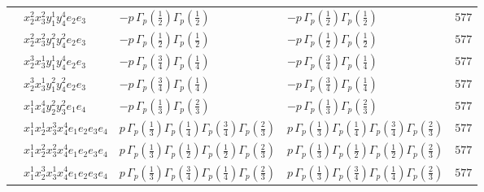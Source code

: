 \documentclass[11pt]{article}
\begin{document}
\begin{table}[ht]
{\begin{tabular}{@{}lllll@{}}
 & $x_{2}^{2} x_{3}^{2} y_{1}^{1} y_{4}^{4} e_{2} e_{3}$ & $- p \, \Gamma_p \left( \frac{1}{2} \right) \Gamma_p \left( \frac{1}{2} \right)$ & $- p \, \Gamma_p \left( \frac{1}{2} \right) \Gamma_p \left( \frac{1}{2} \right)$ & $577$ \\
 & $x_{2}^{2} x_{3}^{2} y_{1}^{2} y_{4}^{2} e_{2} e_{3}$ & $- p \, \Gamma_p \left( \frac{1}{2} \right) \Gamma_p \left( \frac{1}{2} \right)$ & $- p \, \Gamma_p \left( \frac{1}{2} \right) \Gamma_p \left( \frac{1}{2} \right)$ & $577$ \\
 & $x_{2}^{3} x_{3}^{1} y_{1}^{1} y_{4}^{4} e_{2} e_{3}$ & $- p \, \Gamma_p \left( \frac{3}{4} \right) \Gamma_p \left( \frac{1}{4} \right)$ & $- p \, \Gamma_p \left( \frac{3}{4} \right) \Gamma_p \left( \frac{1}{4} \right)$ & $577$ \\
 & $x_{2}^{3} x_{3}^{1} y_{1}^{2} y_{4}^{2} e_{2} e_{3}$ & $- p \, \Gamma_p \left( \frac{3}{4} \right) \Gamma_p \left( \frac{1}{4} \right)$ & $- p \, \Gamma_p \left( \frac{3}{4} \right) \Gamma_p \left( \frac{1}{4} \right)$ & $577$ \\
 & $x_{1}^{1} x_{4}^{4} y_{2}^{2} y_{3}^{2} e_{1} e_{4}$ & $- p \, \Gamma_p \left( \frac{1}{3} \right) \Gamma_p \left( \frac{2}{3} \right)$ & $- p \, \Gamma_p \left( \frac{1}{3} \right) \Gamma_p \left( \frac{2}{3} \right)$ & $577$ \\
 & $x_{1}^{1} x_{2}^{1} x_{3}^{3} x_{4}^{4}  e_{1} e_{2} e_{3} e_{4}$ & $p \, \Gamma_p \left( \frac{1}{3} \right) \Gamma_p \left( \frac{1}{4} \right) \Gamma_p \left( \frac{3}{4} \right) \Gamma_p \left( \frac{2}{3} \right)$ & $p \, \Gamma_p \left( \frac{1}{3} \right) \Gamma_p \left( \frac{1}{4} \right) \Gamma_p \left( \frac{3}{4} \right) \Gamma_p \left( \frac{2}{3} \right)$ & $577$ \\
 & $x_{1}^{1} x_{2}^{2} x_{3}^{2} x_{4}^{4}  e_{1} e_{2} e_{3} e_{4}$ & $p \, \Gamma_p \left( \frac{1}{3} \right) \Gamma_p \left( \frac{1}{2} \right) \Gamma_p \left( \frac{1}{2} \right) \Gamma_p \left( \frac{2}{3} \right)$ & $p \, \Gamma_p \left( \frac{1}{3} \right) \Gamma_p \left( \frac{1}{2} \right) \Gamma_p \left( \frac{1}{2} \right) \Gamma_p \left( \frac{2}{3} \right)$ & $577$ \\
 & $x_{1}^{1} x_{2}^{3} x_{3}^{1} x_{4}^{4}  e_{1} e_{2} e_{3} e_{4}$ & $p \, \Gamma_p \left( \frac{1}{3} \right) \Gamma_p \left( \frac{3}{4} \right) \Gamma_p \left( \frac{1}{4} \right) \Gamma_p \left( \frac{2}{3} \right)$ & $p \, \Gamma_p \left( \frac{1}{3} \right) \Gamma_p \left( \frac{3}{4} \right) \Gamma_p \left( \frac{1}{4} \right) \Gamma_p \left( \frac{2}{3} \right)$ & $577$ \\

\end{tabular}}
\end{table}
\end{document}
